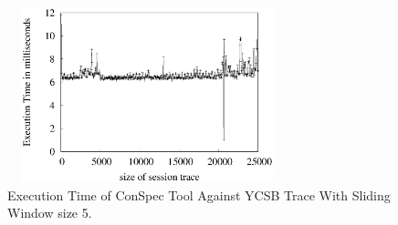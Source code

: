 \documentclass[journal, compsoc]{IEEEtran}
\begin{document}
\begin{figure}%
	\includegraphics[width=3.2in,height=2in]
	{conspecExecutionTimes.eps} %
	\caption{Execution Time of ConSpec Tool Against YCSB Trace With Sliding Window size 5.}
	\label{fig:exampleIter}
\end{figure}
	
\end{document}
